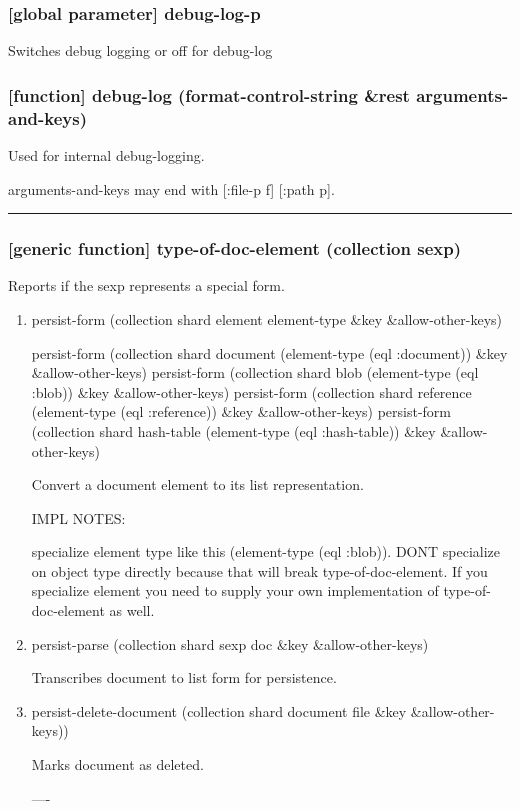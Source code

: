 \documentclass[11pt]{article}
\begin{document}
\subsubsection{[global parameter] \textbf{debug-log-p}}
\label{sec:orgc3ed7f1}

Switches debug logging or off for debug-log

\subsubsection{[function] debug-log (format-control-string \&rest arguments-and-keys)}
\label{sec:org802c7e5}

Used for internal debug-logging.

arguments-and-keys may end with [:file-p f] [:path p].

\noindent\rule{\textwidth}{0.5pt}

\subsubsection{[generic function] type-of-doc-element (collection sexp)}
\label{sec:orgc21cac5}

Reports if the sexp represents a special form.

\begin{enumerate}
\item{} persist-form (collection shard element element-type \&key \&allow-other-keys)
\label{sec:orgad0a01e}

persist-form (collection shard document (element-type (eql :document)) \&key \&allow-other-keys)
persist-form (collection shard blob (element-type (eql :blob)) \&key \&allow-other-keys)
persist-form (collection shard reference (element-type (eql :reference)) \&key \&allow-other-keys)
persist-form (collection shard hash-table (element-type (eql :hash-table)) \&key \&allow-other-keys)

Convert a document element to its list representation.

IMPL NOTES:

specialize element type like this (element-type (eql :blob)). DONT
specialize on object type directly because that will break
type-of-doc-element. If you specialize element you need to supply your
own implementation of type-of-doc-element as well.

\item{} persist-parse (collection shard sexp doc \&key \&allow-other-keys)
\label{sec:orga5f4caf}

Transcribes document to list form for persistence.

\item{} persist-delete-document (collection shard document file \&key \&allow-other-keys))
\label{sec:orgb946f83}

Marks document as deleted.

----
\end{enumerate}
\end{document}
